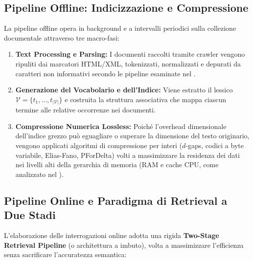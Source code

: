 \FloatBarrier
\subsection{Pipeline Offline: Indicizzazione e Compressione}
\label{subsec:pipeline-offline}
La pipeline offline opera in background e a intervalli periodici sulla collezione documentale attraverso tre macro-fasi:
\begin{enumerate}
    \item \textbf{Text Processing e Parsing:} I documenti raccolti tramite crawler vengono ripuliti dai marcatori HTML/XML, tokenizzati, normalizzati e depurati da caratteri non informativi secondo le pipeline esaminate nel .
    \item \textbf{Generazione del Vocabolario e dell'Indice:} Viene estratto il lessico $\mathcal{V} = \{t_1, \dots, t_{|\mathcal{V}|}\}$ e costruita la struttura associativa che mappa ciascun termine alle relative occorrenze nei documenti.
    \item \textbf{Compressione Numerica Lossless:} Poich\'e l'overhead dimensionale dell'indice grezzo pu\`o eguagliare o superare la dimensione del testo originario, vengono applicati algoritmi di compressione per interi ($d$-gaps, codici a byte variabile, Elias-Fano, PForDelta) volti a massimizzare la residenza dei dati nei livelli alti della gerarchia di memoria (RAM e cache CPU, come analizzato nel ).
\end{enumerate}

\FloatBarrier
\subsection{Pipeline Online e Paradigma di Retrieval a Due Stadi}
\label{subsec:pipeline-online-two-stage}
L'elaborazione delle interrogazioni online adotta una rigida \textbf{Two-Stage Retrieval Pipeline} (o architettura a imbuto), volta a massimizzare l'efficienza senza sacrificare l'accuratezza semantica:

